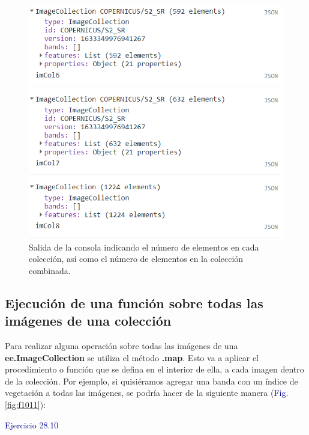 \documentclass[
  12pt,
  letterpaper,
  twoside]{book}
\newcommand\boldpurple[1]{\textcolor{darkpurple}{\textbf{#1}}}
\begin{document}
\begin{figure}[H]

{\centering \includegraphics[width=0.8\linewidth]{Img/merge2colecciones} 

}

\caption{Salida de la consola indicando el número de elementos en cada colección, así como el número de elementos en la colección combinada.}\label{fig:f1010}
\end{figure}

\hypertarget{ejecuciuxf3n-de-una-funciuxf3n-sobre-todas-las-imuxe1genes-de-una-colecciuxf3n}{%
\subsection*{Ejecución de una función sobre todas las imágenes de una colección}\label{ejecuciuxf3n-de-una-funciuxf3n-sobre-todas-las-imuxe1genes-de-una-colecciuxf3n}}

Para realizar alguna operación sobre todas las imágenes de una \boldpurple{ee.ImageCollection} se utiliza el método \boldpurple{.map}. Esto va a aplicar el procedimiento o función que se defina en el interior de ella, a cada imagen dentro de la colección. Por ejemplo, si quisiéramos agregar una banda con un índice de vegetación a todas las imágenes, se podría hacer de la siguiente manera (\textcolor{darkblue}{Fig.} \ref{fig:f1011}):

\textcolor{darkblue}{Ejercicio 28.10}
\end{document}

